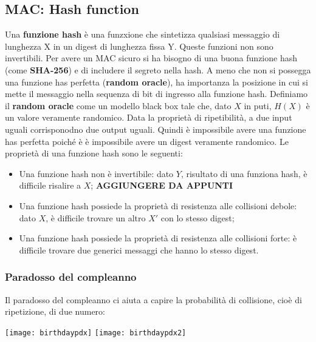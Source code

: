 \documentclass{article}
\theoremstyle{remark}
\begin{document}
\subsection{MAC: Hash function}
Una \textbf{funzione hash} è una funzxione che sintetizza qualsiasi messaggio di lunghezza X in un digest di lunghezza fissa Y. Queste funzioni non sono invertibili.
Per avere un MAC sicuro si ha bisogno di una buona funzione hash (come \textbf{SHA-256}) e di includere il segreto nella hash. A meno che non si possegga una funzione has perfetta (\textbf{random oracle}), ha importanza la posizione in cui si mette il messaggio nella sequenza di bit di ingresso alla funzione hash.
Definiamo il \textbf{random oracle} come un modello black box tale che, dato $X$ in puti, $H(X)$ è un valore veramente randomico. 
Data la proprietà di ripetibilità, a due input uguali corrisponodno due output uguali. Quindi è impossibile avere una funzione has perfetta poiché è è impossibile avere un digest veramente randomico.
Le proprietà di una funzione hash sono le seguenti:
\begin{itemize}
    \item Una funzione hash non è invertibile: dato $Y$, risultato di una funziona hash, è difficile risalire a $X$;
    \textbf{AGGIUNGERE DA APPUNTI}
    \item Una funzione hash possiede la proprietà di resistenza alle collisioni debole: dato $X$, è difficile trovare un altro $X'$ con lo stesso digest;
    \item Una funzione hash possiede la proprietà di resistenza alle collisioni forte: è difficile trovare due generici messaggi che hanno lo stesso digest.
\end{itemize}
\subsubsection{Paradosso del compleanno}
Il paradosso del compleanno ci aiuta a capire la probabilità di collisione, cioè di ripetizione, di due numero:
\begin{center}
    \texttt{[image: birthdaypdx]}
    \texttt{[image: birthdaypdx2]}
\end{center}
\end{document}
